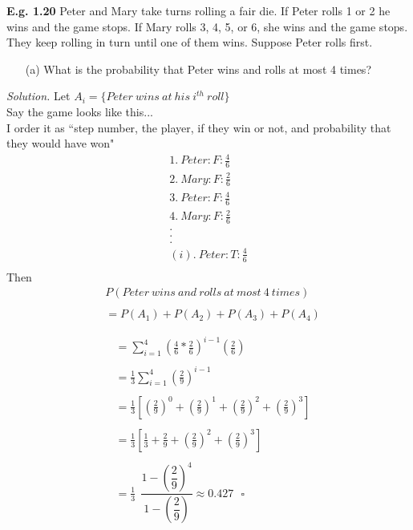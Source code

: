 \documentclass[12pt]{book}
\begin{document}
\newpage
\noindent \textbf{E.g. 1.20} Peter and Mary take turns rolling a fair die. If Peter rolls 1 or 2 he wins and the game stops. If Mary rolls 3, 4, 5, or 6, she wins and the game stops. They keep rolling in turn until one of them wins. Suppose Peter rolls first.
\begin{itemize}\item [(a)] What is the probability that Peter wins and rolls at most 4 times?\end{itemize}
\textit{Solution.} 
Let $A_i=\{Peter~wins~at~his~i^{th}~roll\}$\\
Say the game looks like this...\\
I order it as ``step number, the player, if they win or not, and probability that they would have won"\\
$$\begin{aligned}
1.~Peter : F : \frac{4}{6}\\
2.~Mary : F : \frac{2}{6}\\
3.~Peter : F : \frac{4}{6}\\
4.~Mary : F : \frac{2}{6}\\
.\\
.\\
.\\
(i).~Peter : T : \frac{4}{6}\\
\end{aligned} $$
Then 
\begin{align*}
&P(Peter~wins~and~rolls~at~most~4~times)\\\\
&=P(A_{1}) + P(A_{2}) + P(A_{3}) + P(A_{4}) \\\\
\end{align*}
\begin{align*}
&=\displaystyle\sum\limits_{i=1}^{4} \left(\frac{4}{6}* \frac{2}{6}\right)^{i-1} \left(\frac{2}{6}\right)\\\\
&=\frac{1}{3}\sum\limits_{i=1}^{4} \left(\frac{2}{9}\right)^{i-1}\\\\
&=\frac{1}{3} \left[ \left(\frac{2}{9}\right)^{0} + \left(\frac{2}{9}\right)^{1}+ \left(\frac{2}{9}\right)^{2} + \left(\frac{2}{9}\right)^{3} \right] \\\\
&=\frac{1}{3} \left[ \frac{1}{3} + \frac{2}{9} + \left(\frac{2}{9}\right)^{2} + \left(\frac{2}{9}\right)^{3} \right] \\\\
&=\frac{1}{3} ~~\dfrac{1-\left(\dfrac{2}{9}\right)^{4}}{1-\left(\dfrac{2}{9}\right)} \approx 0.427~~~\square
\end{align*}
\end{document}
